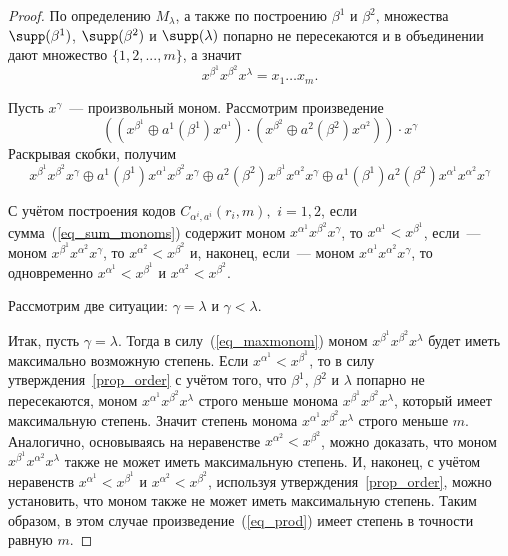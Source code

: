 \begin{proof}
	По определению \(M_{\lambda}\), а также по построению \(\beta^1\) и \(\beta^2\), множества \(\supp(\beta^1)\), \(\supp(\beta^2)\) и \(\supp(\lambda)\) попарно не пересекаются и в объединении дают множество $\{1,2,...,m\}$, а значит
	\begin{equation}
		\label{eq_maxmonom}
		x^{\beta^1}x^{\beta^2}x^{\lambda}=x_1\ldots x_m.
	\end{equation}

	Пусть \(x^{\gamma}\)~--- произвольный моном.
	Рассмотрим произведение
	\begin{equation}
		\label{eq_prod}
		\left( \left(x^{\beta^1}\oplus a^1(\beta^1)x^{\alpha^1}\right)\cdot \left(x^{\beta^2} \oplus a^2(\beta^2)x^{\alpha^2}\right)\right)\cdot x^{\gamma}
	\end{equation}
	Раскрывая скобки, получим
	\begin{equation}
		\label{eq_sum_monoms}
		x^{\beta^1}x^{\beta^2}x^{\gamma}\oplus a^1(\beta^1)x^{\alpha^1}x^{\beta^2}x^{\gamma} \oplus a^2(\beta^2)x^{\beta^1}x^{\alpha^2}x^{\gamma} \oplus a^1(\beta^1)a^2(\beta^2)x^{\alpha^1}x^{\alpha^2}x^{\gamma}
	\end{equation}

	С учётом построения кодов \(C_{\alpha^i,a^i}(r_i,m),\) \(i=1,2\), если сумма~(\ref{eq_sum_monoms}) содержит моном \(x^{\alpha^1}x^{\beta^2}x^{\gamma}\), то \(x^{\alpha^1}<x^{\beta^1}\), если~--- моном \(x^{\beta^1}x^{\alpha^2}x^{\gamma}\), то \(x^{\alpha^2}<x^{\beta^2}\) и, наконец, если~--- моном \(x^{\alpha^1}x^{\alpha^2}x^{\gamma}\), то одновременно \(x^{\alpha^1}<x^{\beta^1}\) и \(x^{\alpha^2}<x^{\beta^2}\).

	Рассмотрим две ситуации: \(\gamma=\lambda\) и \(\gamma < \lambda\).

	Итак, пусть \(\gamma=\lambda\).
	Тогда в силу~(\ref{eq_maxmonom}) моном \(x^{\beta^1}x^{\beta^2}x^{\lambda}\) будет иметь максимально возможную степень.
	Если \(x^{\alpha^1}<x^{\beta^1}\), то в силу утверждения~\ref{prop_order} с учётом того, что \(\beta^1\), \(\beta^2\) и \(\lambda\) попарно не пересекаются, моном \(x^{\alpha^1}x^{\beta^2}x^{\lambda}\) строго меньше монома \(x^{\beta^1}x^{\beta^2}x^{\lambda}\), который имеет максимальную степень.
	Значит степень монома \(x^{\alpha^1}x^{\beta^2}x^{\lambda}\) строго меньше \(m\).
	Аналогично, основываясь на неравенстве \(x^{\alpha^2}<x^{\beta^2}\), можно доказать, что моном \(x^{\beta^1}x^{\alpha^2}x^{\lambda}\) также не может иметь максимальную степень.
	И, наконец, с учётом неравенств \(x^{\alpha^1}<x^{\beta^1}\) и \(x^{\alpha^2}<x^{\beta^2}\), используя утверждения~\ref{prop_order}, можно установить, что моном также не может иметь максимальную степень.
	Таким образом, в этом случае произведение~(\ref{eq_prod}) имеет степень в точности равную \(m\).


\end{proof}
